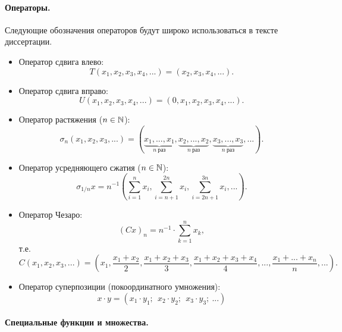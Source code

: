 \paragraph{Операторы.}
Следующие обозначения операторов будут широко использоваться в тексте диссертации.
\begin{itemize}
	\item
		Оператор сдвига влево:
		\begin{equation}
			T(x_1, x_2, x_3, x_4, ...) = (x_2, x_3, x_4, ...)
			.
		\end{equation}
	\item
		Оператор сдвига вправо:
		\begin{equation}
			U(x_1, x_2, x_3, x_4, ...) = (0, x_1, x_2, x_3, x_4, ...)
			.
		\end{equation}
	\item
		Оператор растяжения ($n\in\mathbb{N}$):
		\begin{equation}
			\sigma_n (x_1, x_2, x_3, ...) = (
				\underbrace{x_1,...,x_1}_{n~\text{раз}},
				\underbrace{x_2,...,x_2}_{n~\text{раз}},
				\underbrace{x_3,...,x_3}_{n~\text{раз}},
				...)
			.
		\end{equation}
	\item
		Оператор усредняющего сжатия ($n\in\mathbb{N}$):
		\begin{equation}
			\sigma_{1/n} x = n^{-1}
			\left(
				\sum_{i=1}^{n} x_i,
				\sum_{i=n+1}^{2n} x_i,
				\sum_{i=2n+1}^{3n} x_i,
				...
			\right).
		\end{equation}
	\item
		Оператор Чезаро:
		\begin{equation}
			(Cx)_n = n^{-1} \cdot \sum_{k=1}^n x_k
			,
		\end{equation}
		т.е.
		\begin{equation}
			C (x_1, x_2, x_3, ...) = \left(
			x_1,
			\dfrac{x_1+x_2}2,
			\dfrac{x_1+x_2 + x_3}3,
			\dfrac{x_1+x_2+x_3+x_4}4,
			...,
			\dfrac{x_1+...+x_n}n,
			...\right)
			.
		\end{equation}

	\item
		Оператор суперпозиции (покоординатного умножения):
		\begin{equation}
			x \cdot y = (x_1\cdot y_1; ~~x_2\cdot y_2; ~~x_3\cdot y_3; ~...)
		\end{equation}
\end{itemize}


\paragraph{Специальные функции и множества.}

